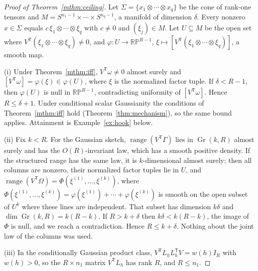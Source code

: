 \documentclass[11pt,a4paper]{article}
\theoremstyle{definition}
\theoremstyle{remark}
\numberwithin{equation}{section}
\newcommand{\T}{{\mathsf T}}
\newcommand{\range}{\operatorname{range}}
\newcommand{\Gr}{\operatorname{Gr}}
\newcommand{\RP}{\mathbb{RP}}
\begin{document}
\begin{proof}[Proof of Theorem~\ref{mthm:ceiling}]
Let $\Sigma=\{x_1\otimes\cdots\otimes x_q\}$ be the cone of rank-one tensors and
$M=S^{n_1-1}\times\cdots\times S^{n_q-1}$, a manifold of dimension $\delta$.
Every nonzero $x\in\Sigma$ equals $c\,\xi_1\otimes\cdots\otimes\xi_q$ with $c\ne0$
and $(\xi_j)\in M$. Let $U\subseteq M$ be the open set where
$V^\T(\xi_1\otimes\cdots\otimes\xi_q)\ne0$, and
$\varphi\colon U\to\RP^{R-1}$, $\xi\mapsto[V^\T(\xi_1\otimes\cdots\otimes\xi_q)]$,
a smooth map.

(i) Under Theorem~\ref{mthm:iff}, $V^\T\omega\ne0$ almost surely and
$[V^\T\omega]=\varphi(\xi)\in\varphi(U)$, where $\xi$ is the normalized factor
tuple. If $\delta<R-1$, then $\varphi(U)$ is null in $\RP^{R-1}$, contradicting
uniformity of $[V^\T\omega]$. Hence $R\le\delta+1$. Under conditional scalar
Gaussianity the conditions of Theorem~\ref{mthm:iff} hold
(Theorem~\ref{thm:mechanism}), so the same bound applies. Attainment is
Example~\ref{ex:hook} below.

(ii) Fix $k<R$. For the Gaussian sketch, $\range(V^\T\Gamma)$ lies in
$\Gr(k,R)$ almost surely and has the $O(R)$-invariant law, which has a smooth
positive density. If the structured range has the same law, it is
$k$-dimensional almost surely; then all columns are nonzero, their
normalized factor tuples lie in $U$, and
$\range(V^\T\Omega)=\Phi(\xi^{(1)},\ldots,\xi^{(k)})$, where
$\Phi(\xi^{(1)},\ldots,\xi^{(k)})=\varphi(\xi^{(1)})+\cdots+\varphi(\xi^{(k)})$ is
smooth on the open subset of $U^k$ where these lines are independent. That
subset has dimension $k\delta$ and $\dim\Gr(k,R)=k(R-k)$. If $R>k+\delta$ then
$k\delta<k(R-k)$, the image of $\Phi$ is null, and we reach a contradiction.
Hence $R\le k+\delta$. Nothing about the joint law of the columns was used.

(iii) In the conditionally Gaussian product class,
$V^\T L_hL_h^\T V=w(h)I_R$ with $w(h)>0$, so the $R\times n_1$ matrix $V^\T L_h$
has rank $R$, and $R\le n_1$.
\end{proof}
\end{document}
